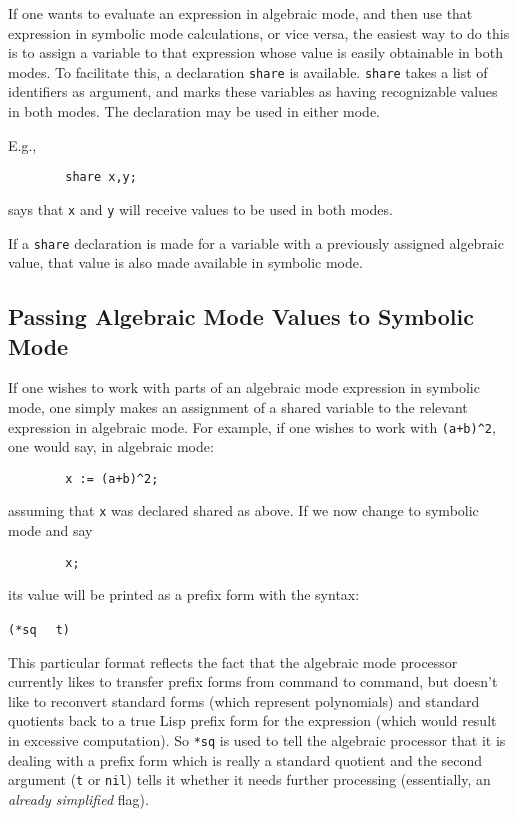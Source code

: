 If one wants to evaluate an expression in algebraic mode, and then use
that expression in symbolic mode calculations, or vice versa, the easiest
way to do this is to assign a variable to that expression whose value is
easily obtainable in both modes.  To facilitate this, a declaration 
\texttt{share} is available. \texttt{share} takes a list of
identifiers as argument, and marks these variables as having recognizable
values in both modes.  The declaration may be used in either mode.

E.g.,
\begin{verbatim}
        share x,y;
\end{verbatim}
says that \texttt{x} and \texttt{y} will receive values to be used in both modes.

If a \texttt{share} declaration is made for a variable with a previously
assigned algebraic value, that value is also made available in symbolic
mode.

\subsection{Passing Algebraic Mode Values to Symbolic Mode}

If one wishes to work with parts of an algebraic mode
 expression in symbolic mode,
one simply makes an assignment of a shared variable to
the relevant expression in algebraic mode.  For example, if one wishes to
work with \texttt{(a+b)\textasciicircum 2}, one would say, in algebraic mode:
\begin{verbatim}
        x := (a+b)^2;
\end{verbatim}
assuming that \texttt{x} was declared shared as above.  If we now change to
symbolic mode and say
\begin{verbatim}
        x;
\end{verbatim}
its value will be printed as a prefix form with the syntax:
\begin{syntax}
        \texttt{(*sq }  \texttt{ t)}
\end{syntax}
This particular format reflects the fact that the algebraic mode processor
currently likes to transfer prefix forms from command to command, but
doesn't like to reconvert standard forms (which
represent polynomials) and standard quotients back to a true Lisp prefix
form for the expression (which would result in excessive computation).  So
\texttt{*sq} is used to tell the algebraic processor that it is dealing with
a prefix form which is really a standard quotient and the second argument (\texttt{t} or \texttt{nil}) tells it whether
it needs further processing (essentially, an \emph{already simplified}
flag).

